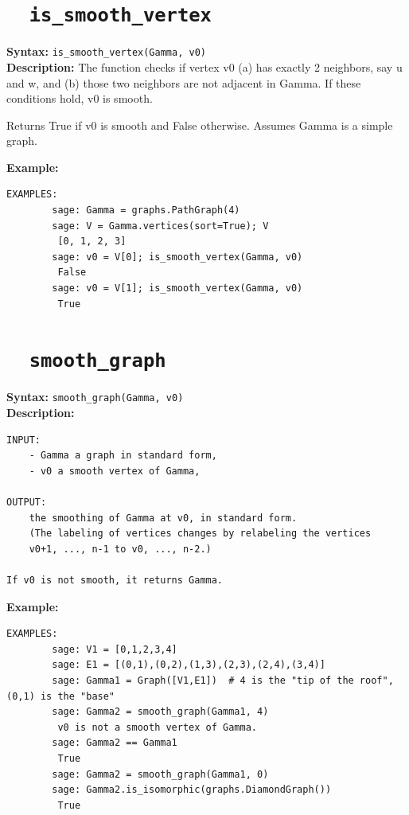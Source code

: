\documentclass{article}
\begin{document}
\section{\tt \ \ is\_smooth\_vertex}

\textbf{Syntax:} \verb}is_smooth_vertex(Gamma, v0)}\\

\textbf{Description:}
The function checks if vertex v0
 (a) has exactly 2 neighbors, say u and w, and
 (b) those two neighbors are not adjacent in Gamma.
If these conditions hold, v0 is smooth.

Returns True if v0 is smooth and False otherwise.
    Assumes Gamma is a simple graph.

\textbf{Example:}
\begin{verbatim}
EXAMPLES:
        sage: Gamma = graphs.PathGraph(4)
        sage: V = Gamma.vertices(sort=True); V
         [0, 1, 2, 3]
        sage: v0 = V[0]; is_smooth_vertex(Gamma, v0)
         False
        sage: v0 = V[1]; is_smooth_vertex(Gamma, v0)
         True
\end{verbatim}

\section{\tt \ \ smooth\_graph}

\textbf{Syntax:} \verb}smooth_graph(Gamma, v0)}\\

\textbf{Description:}
\begin{verbatim}
INPUT:
    - Gamma a graph in standard form,
    - v0 a smooth vertex of Gamma,

OUTPUT:
    the smoothing of Gamma at v0, in standard form.
    (The labeling of vertices changes by relabeling the vertices
    v0+1, ..., n-1 to v0, ..., n-2.)

If v0 is not smooth, it returns Gamma.
\end{verbatim}

\textbf{Example:}
\begin{verbatim}
EXAMPLES:
        sage: V1 = [0,1,2,3,4]
        sage: E1 = [(0,1),(0,2),(1,3),(2,3),(2,4),(3,4)]
        sage: Gamma1 = Graph([V1,E1])  # 4 is the "tip of the roof", (0,1) is the "base"
        sage: Gamma2 = smooth_graph(Gamma1, 4)
         v0 is not a smooth vertex of Gamma.
        sage: Gamma2 == Gamma1
         True
        sage: Gamma2 = smooth_graph(Gamma1, 0)
        sage: Gamma2.is_isomorphic(graphs.DiamondGraph())
         True
\end{verbatim}
\end{document}
